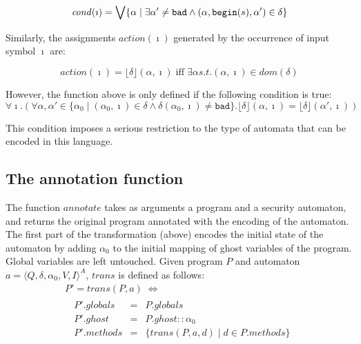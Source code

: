 \documentclass[10pt,notitlepage,twoside]{article}
\newcommand{\aut}{a}
\newcommand{\automata}[5]{\langle #1,#2,#3,#4,#5 \rangle^A}
\newcommand{\qu}{\alpha}
\newcommand{\theautomaton}{\automata{Q}{\delta}{\qu_0}{V}{I}}
\newcommand{\floor}[1]{\lfloor #1 \rfloor}
\begin{document}
\begin{displaymath}
\mathit{cond}(\imath) = \bigvee \{ \qu \mid \exists \qu' \neq \texttt{bad} \wedge (\qu,\texttt{begin}(s),\qu') \in \delta  \} \\
\end{displaymath}

Similarly, the assignments $\mathit{action}(\imath)$ generated by the occurrence of input symbol $\imath$ are:

\begin{displaymath}
\mathit{action}(\imath) = \floor{\delta}(\qu,\imath) \;\mbox{iff}\; \exists \qu s.t. (\qu,\imath) \in dom(\delta) 
\end{displaymath}

However, the function above is only defined if the following condition is true:
\begin{displaymath}
\forall \imath. (\forall \qu,\qu' \in \{ \qu_0 \mid (\qu_0,\imath) \in \delta \wedge \delta(\qu_0,\imath) \neq \texttt{bad} \}.
\floor{\delta}(\qu,\imath) = \floor{\delta}(\qu',\imath) )
\end{displaymath}

This condition imposes a serious restriction to the type of automata that can be encoded in this language. 

\subsection{The annotation function}


The function $\mathit{annotate}$ takes as arguments a program and a security automaton, and returns the original program annotated with the encoding of the automaton.
The first part of the transformation (above) encodes the initial state of the automaton by adding  $\qu_0$  to the initial mapping of ghost variables of the program. Global variables are left untouched.
Given program $P$ and automaton $\aut = \theautomaton$, $\mathit{trans}$ is defined as follows:
\begin{displaymath}
\begin{array}{l}
P' = \mathit{trans}(P,\aut) \;\Leftrightarrow \\
\;\;\begin{array}{rcl}
P'.\mathit{globals} & = & P.\mathit{globals} \\
P'.\mathit{ghost} & = & P.\mathit{ghost} :: \qu_0 \\
P'.\mathit{methods} & = & \{ \mathit{trans}(P,\aut,d) \mid d \in P.\mathit{methods} \}
\end{array}
\end{array}
\end{displaymath}
\end{document}

